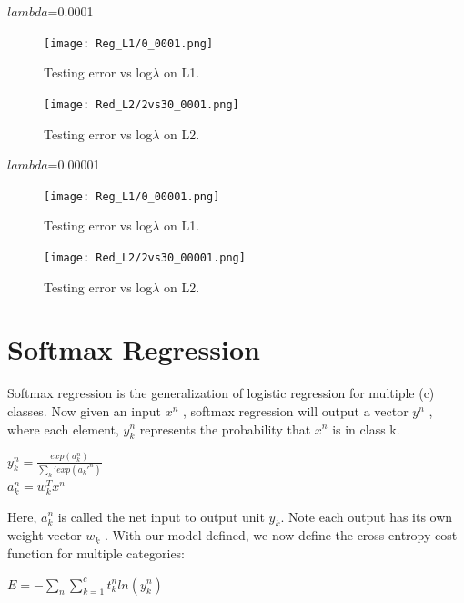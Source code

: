 \documentclass{article} %
\begin{document}
$lambda$=0.0001

\begin{figure}[H]
\begin{center}
\texttt{[image: Reg\_L1/0\_0001.png]}
\end{center}
\caption{Testing error vs log$\lambda$ on L1.}
\end{figure}

\begin{figure}[H]
\begin{center}
\texttt{[image: Red\_L2/2vs30\_0001.png]}
\end{center}
\caption{Testing error vs log$\lambda$ on L2.}
\end{figure}

$lambda$=0.00001

\begin{figure}[H]
\begin{center}
\texttt{[image: Reg\_L1/0\_00001.png]}
\end{center}
\caption{Testing error vs log$\lambda$ on L1.}
\end{figure}

\begin{figure}[H]
\begin{center}
\texttt{[image: Red\_L2/2vs30\_00001.png]}
\end{center}
\caption{Testing error vs log$\lambda$ on L2.}
\end{figure}


\section{Softmax Regression}
Softmax regression is the generalization of logistic regression for multiple (c) classes. Now given an input $x^n$ , softmax regression will output a vector $y^n$ , where each element, $y_k^n$ represents the probability that $x^n$ is in class k.\\
\begin{center}
$y_k^n = \frac{exp(a_{k}^n)}{\sum_k' exp(a_k'^n)}$\\
$a_{k}^n = w_k^T x^n$\\
\end{center}

Here, $a_{k}^n$ is called the net input to output unit $y_k$. Note each output has its own weight vector $w_k$ . With our model defined, we now define the cross-entropy cost function for multiple categories:
\begin{center}
$E = −\sum_n \sum_{k=1}^{c} t^n_k ln(y_k^n)$
\end{center}
\end{document}
